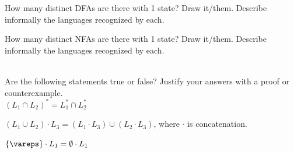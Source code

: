 \documentclass[solution, letterpaper]{cs121}
\begin{document}
\subproblem How many distinct DFAs are there with 1 state? Draw it/them. Describe informally the languages recognized by each.

\subproblem How many distinct NFAs are there with 1 state? Draw it/them. Describe informally the languages recognized by each.
\\\\

Are the following statements true or false? Justify your answers with a proof or counterexample.\\
\subproblem $(L_1 \cap L_2)^* = L_1^* \cap L_2^*$

\subproblem $(L_1 \cup L_2) \cdot L_3 = (L_1 \cdot L_3) \cup (L_2 \cdot L_3)$, where $\cdot$ is concatenation.

\subproblem $\{ \vareps\} \cdot L_1 = \emptyset \cdot L_1$
\\\\
\end{document}
